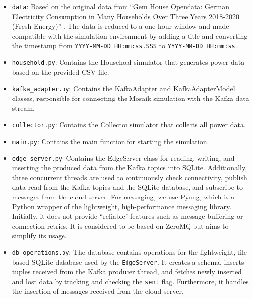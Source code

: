 \documentclass[a4paper]{article}
\begin{document}
\begin{itemize}

    \item \texttt{data}: Based on the original data from \enquote{Gem House
        Opendata: German Electricity Consumption in Many Households Over Three
    Years 2018-2020 (Fresh Energy)} \cite{milojkovic2021}. The data is reduced
    to a one hour window and made compatible with the simulation environment by
    adding a title and converting the timestamp from \texttt{YYYY-MM-DD
    HH:mm:ss.SSS} to \texttt{YYYY-MM-DD HH:mm:ss}.

    \item \texttt{household.py}: Contains the Household simulator that generates
        power data based on the provided CSV file.

    \item \texttt{kafka\_adapter.py}: Contains the KafkaAdapter and
        KafkaAdapterModel classes, responsible for connecting the Mosaik
        simulation with the Kafka data stream.

    \item \texttt{collector.py}: Contains the Collector simulator that collects
        all power data.

    \item \texttt{main.py}: Contains the main function for starting the
        simulation.

    \item \texttt{edge\_server.py}: Contains the EdgeServer class for reading,
        writing, and inserting the produced data from the Kafka topics into
        SQLite. Additionally, three concurrent threads are used to continuously
        check connectivity, publish data read from the Kafka topics and the
        SQLite database, and subscribe to messages from the cloud server. For
        messaging, we use Pynng, which is a Python wrapper of the lightweight,
        high-performance messaging library. Initially, it does not provide
        \enquote{reliable} features such as message buffering or connection
        retries. It is considered to be based on ZeroMQ but aims to simplify its
        usage.

    \item \texttt{db\_operations.py}: The database contains operations for the
        lightweight, file-based SQLite database used by the \texttt{EdgeServer}.
        It creates a schema, inserts tuples received from the Kafka producer
        thread, and fetches newly inserted and lost data by tracking and
        checking the \texttt{sent} flag. Furthermore, it handles the insertion
        of messages received from the cloud server.


\end{itemize}
\end{document}
